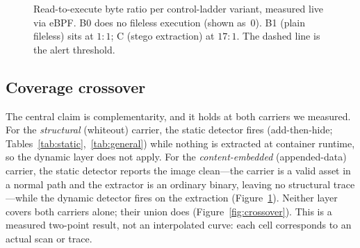 \documentclass[sigconf,nonacm]{acmart}
\begin{document}
\begin{figure}[t]
\centering
{}
\caption{Read-to-execute byte ratio per control-ladder variant, measured live via
eBPF. B0 does no fileless execution (shown as~0). B1 (plain fileless) sits at
$1{:}1$; C (stego extraction) at $17{:}1$. The dashed line is the alert threshold.}
\label{fig:ratio}
\end{figure}

\subsection{Coverage crossover}
The central claim is complementarity, and it holds at both carriers we
measured. For the \emph{structural} (whiteout) carrier, the static detector fires
(add-then-hide; Tables~\ref{tab:static},~\ref{tab:general}) while nothing is
extracted at container runtime, so the dynamic layer does not apply. For the
\emph{content-embedded} (appended-data) carrier, the static detector reports the
image clean---the carrier is a valid asset in a normal path and the extractor is
an ordinary binary, leaving no structural trace---while the dynamic detector
fires on the extraction (Figure~\ref{fig:ratio}). Neither layer covers both
carriers alone; their union does (Figure~\ref{fig:crossover}). This is a measured
two-point result, not an interpolated curve: each cell corresponds to an actual
scan or trace.
\end{document}

